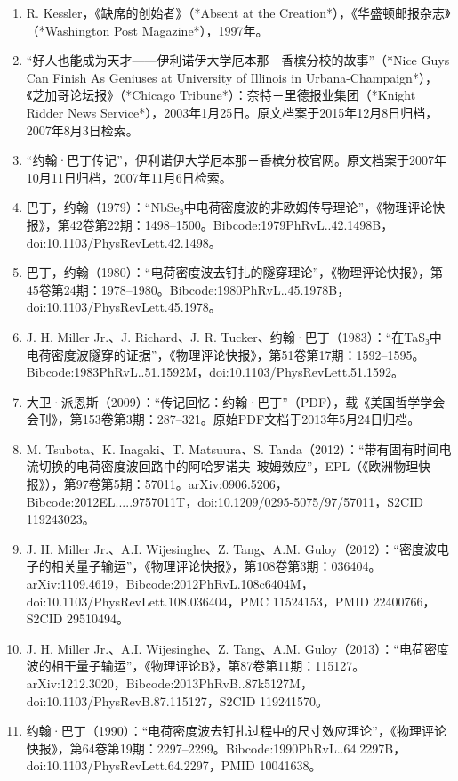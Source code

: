 \begin{enumerate}
\item R. Kessler，《缺席的创始者》（*Absent at the Creation*），《华盛顿邮报杂志》（*Washington Post Magazine*），1997年。

\item “好人也能成为天才——伊利诺伊大学厄本那－香槟分校的故事”（*Nice Guys Can Finish As Geniuses at University of Illinois in Urbana-Champaign*），《芝加哥论坛报》（*Chicago Tribune*）：奈特－里德报业集团（*Knight Ridder News Service*），2003年1月25日。原文档案于2015年12月8日归档，2007年8月3日检索。

\item “约翰·巴丁传记”，伊利诺伊大学厄本那－香槟分校官网。原文档案于2007年10月11日归档，2007年11月6日检索。
\item 巴丁，约翰（1979）：“NbSe₃中电荷密度波的非欧姆传导理论”，《物理评论快报》，第42卷第22期：1498–1500。Bibcode:1979PhRvL..42.1498B，doi:10.1103/PhysRevLett.42.1498。
\item 巴丁，约翰（1980）：“电荷密度波去钉扎的隧穿理论”，《物理评论快报》，第45卷第24期：1978–1980。Bibcode:1980PhRvL..45.1978B，doi:10.1103/PhysRevLett.45.1978。
\item J. H. Miller Jr.、J. Richard、J. R. Tucker、约翰·巴丁（1983）：“在TaS₃中电荷密度波隧穿的证据”，《物理评论快报》，第51卷第17期：1592–1595。Bibcode:1983PhRvL..51.1592M，doi:10.1103/PhysRevLett.51.1592。
\item 大卫·派恩斯（2009）：“传记回忆：约翰·巴丁”（PDF），载《美国哲学学会会刊》，第153卷第3期：287–321。原始PDF文档于2013年5月24日归档。
\item M. Tsubota、K. Inagaki、T. Matsuura、S. Tanda（2012）：“带有固有时间电流切换的电荷密度波回路中的阿哈罗诺夫–玻姆效应”，EPL（《欧洲物理快报》），第97卷第5期：57011。arXiv:0906.5206，Bibcode:2012EL.....9757011T，doi:10.1209/0295-5075/97/57011，S2CID 119243023。
\item J. H. Miller Jr.、A.I. Wijesinghe、Z. Tang、A.M. Guloy（2012）：“密度波电子的相关量子输运”，《物理评论快报》，第108卷第3期：036404。arXiv:1109.4619，Bibcode:2012PhRvL.108c6404M，doi:10.1103/PhysRevLett.108.036404，PMC 11524153，PMID 22400766，S2CID 29510494。
\item J. H. Miller Jr.、A.I. Wijesinghe、Z. Tang、A.M. Guloy（2013）：“电荷密度波的相干量子输运”，《物理评论B》，第87卷第11期：115127。arXiv:1212.3020，Bibcode:2013PhRvB..87k5127M，doi:10.1103/PhysRevB.87.115127，S2CID 119241570。
\item 约翰·巴丁（1990）：“电荷密度波去钉扎过程中的尺寸效应理论”，《物理评论快报》，第64卷第19期：2297–2299。Bibcode:1990PhRvL..64.2297B，doi:10.1103/PhysRevLett.64.2297，PMID 10041638。

\end{enumerate}
